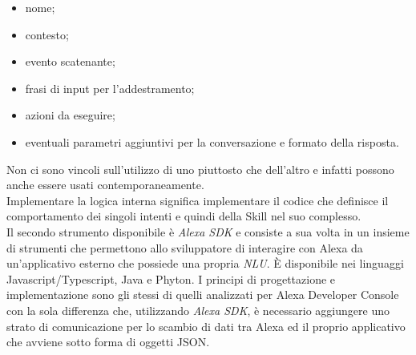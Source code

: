 		\begin{itemize}
			\item nome;
			\item contesto;
			\item evento scatenante;
			\item frasi di input per l'addestramento;
			\item azioni da eseguire;
			\item eventuali parametri aggiuntivi per la conversazione e formato della risposta.
		\end{itemize}
		Non ci sono vincoli sull'utilizzo di uno piuttosto che dell'altro e infatti possono anche essere usati contemporaneamente. \\
		Implementare la logica interna significa implementare il codice che definisce il comportamento dei singoli intenti e quindi della Skill nel suo complesso. \\
		Il secondo strumento disponibile è \textit{Alexa SDK} e consiste a sua volta in un insieme di strumenti che permettono allo sviluppatore di interagire con Alexa da un'applicativo esterno che possiede una propria \textit{NLU}. È disponibile nei linguaggi Javascript/Typescript, Java e Phyton. I principi di progettazione e implementazione sono gli stessi di quelli analizzati per Alexa Developer Console con la sola differenza che, utilizzando \textit{Alexa SDK}, è necessario aggiungere uno strato di comunicazione per lo scambio di dati tra Alexa ed il proprio applicativo che avviene sotto forma di oggetti JSON.

